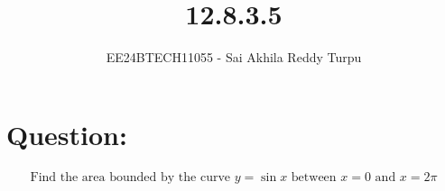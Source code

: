 \documentclass[journal]{IEEEtran}
\begin{document}

\vspace{3cm}

\title{12.8.3.5}
\author{EE24BTECH11055 - Sai Akhila Reddy Turpu}
{\let\newpage\relax\maketitle}

\renewcommand{\thefigure}{\theenumi}
\renewcommand{\thetable}{\theenumi}
\setlength{\intextsep}{10pt} %


\renewcommand{\thetable}{\theenumi}

\section*{Question:}
\begin{align}
\text{Find the area bounded by the curve } y=\sin{x} \text{ between } x=0 \text{ and } x=2\pi
\end{align}
\end{document}
